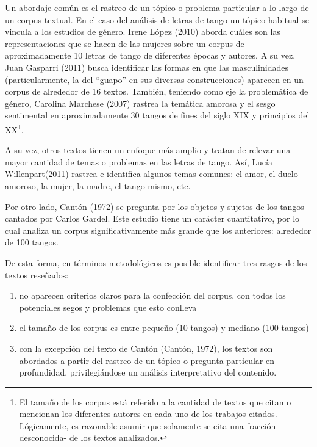 \documentclass[]{article}
\providecommand{\tightlist}{%
  \setlength{\itemsep}{0pt}\setlength{\parskip}{0pt}}
\let\rmarkdownfootnote\footnote%
\def\footnote{\protect\rmarkdownfootnote}
\begin{document}
Un abordaje común es el rastreo de un tópico o problema particular a lo
largo de un corpus textual. En el caso del análisis de letras de tango
un tópico habitual se vincula a los estudios de género. Irene López
(2010) aborda cuáles son las representaciones que se hacen de las
mujeres sobre un corpus de aproximadamente 10 letras de tango de
diferentes épocas y autores. A su vez, Juan Gasparri (2011) busca
identificar las formas en que las masculinidades (particularmente, la
del ``guapo'' en sus diversas construcciones) aparecen en un corpus de
alrededor de 16 textos. También, teniendo como eje la problemática de
género, Carolina Marchese (2007) rastrea la temática amorosa y el sesgo
sentimental en aproximadamente 30 tangos de fines del siglo XIX y
principios del XX\footnote{El tamaño de los corpus está referido a la
  cantidad de textos que citan o mencionan los diferentes autores en
  cada uno de los trabajos citados. Lógicamente, es razonable asumir que
  solamente se cita una fracción -desconocida- de los textos analizados.}.

A su vez, otros textos tienen un enfoque más amplio y tratan de relevar
una mayor cantidad de temas o problemas en las letras de tango. Así,
Lucía Willenpart(2011) rastrea e identifica algunos temas comunes: el
amor, el duelo amoroso, la mujer, la madre, el tango mismo, etc.

Por otro lado, Cantón (1972) se pregunta por los objetos y sujetos de
los tangos cantados por Carlos Gardel. Este estudio tiene un carácter
cuantitativo, por lo cual analiza un corpus significativamente más
grande que los anteriores: alrededor de 100 tangos.

De esta forma, en términos metodológicos es posible identificar tres
rasgos de los textos reseñados:

\begin{enumerate}
\def\labelenumi{\arabic{enumi}.}
\tightlist
\item
  no aparecen criterios claros para la confección del corpus, con todos
  los potenciales segos y problemas que esto conlleva
\item
  el tamaño de los corpus es entre pequeño (10 tangos) y mediano (100
  tangos)
\item
  con la excepción del texto de Cantón (Cantón, 1972), los textos son
  abordados a partir del rastreo de un tópico o pregunta particular en
  profundidad, privilegiándose un análisis interpretativo del contenido.
\end{enumerate}
\end{document}
